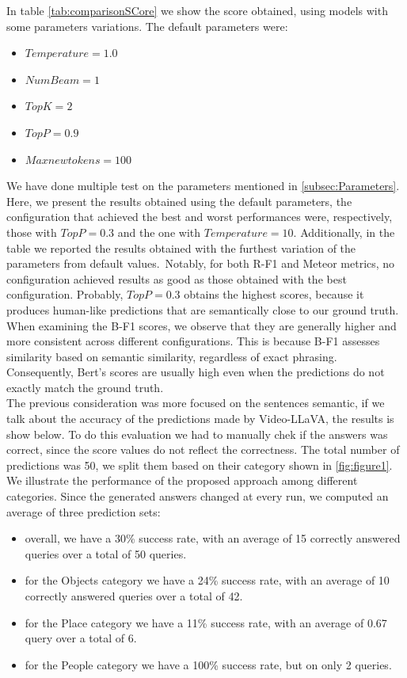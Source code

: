 \documentclass[10pt,twocolumn,letterpaper]{article}
\begin{document}
In table \ref{tab:comparisonSCore} we show the score obtained, using models with some parameters variations.
The default parameters were:

\begin{itemize}
\footnotesize  %
\itemsep=0.1cm    
    \item {$Temperature = 1.0$}
    \item {$Num Beam = 1$}
    \item {$Top K = 2$}
    \item {$Top P = 0.9$}
    \item {$Max new tokens = 100$}
\end{itemize}

We have done multiple test on the parameters mentioned in \ref{subsec:Parameters}. Here, we present the results obtained using the default parameters, the configuration that achieved the best and worst performances were, respectively, those with $Top P = 0.3$ and the one with $Temperature = 10$. Additionally, in the table we reported the results obtained with the furthest variation of the parameters from default values.\
Notably, for both R-F1 and Meteor metrics, no configuration achieved results as good as those obtained with the best configuration. Probably, $Top P = 0.3$ obtains the highest scores, because it produces human-like predictions that are semantically close to our ground truth. When examining the B-F1 scores, we observe that they are generally higher and more consistent across different configurations. This is because B-F1 assesses similarity based on semantic similarity, regardless of exact phrasing. Consequently, Bert's scores are usually high even when the predictions do not exactly match the ground truth.
\\
The previous consideration was more focused on the sentences semantic, if we talk about the accuracy of the predictions made by Video-LLaVA, the results is show below. To do this evaluation we had to manually chek if the answers was correct, since the score values do not reflect the correctness. The total number of predictions was 50, we split them based on their category shown in \ref{fig:figure1}. We illustrate the performance of the proposed approach among different categories.
Since the generated answers changed at every run, we computed an average of three prediction sets:

\begin{itemize}
\itemsep=0.1cm  
\small
    \item overall, we have a 30\% success rate, with an average of 15 correctly answered queries over a total of 50 queries.
    \item for the Objects category we have a 24\% success rate, with an average of 10 correctly answered queries over a total of 42.
    \item for the Place category we have a 11\% success rate, with an average of 0.67 query over a total of 6.
    \item for the People category we have a 100\% success rate, but on only 2 queries.   
\end{itemize}
\end{document}
